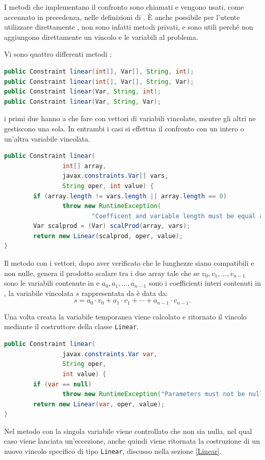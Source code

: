I metodi che implementano il confronto sono chiamati  e vengono
usati, come accennato in precedenza, nelle definizioni di . \`E
anche possibile per l'utente utilizzare direttamente , non sono 
infatti
metodi privati, e sono utili perché non aggiungono direttamente un vincolo
e le variabili al problema.

Vi sono quattro differenti metodi :
\begin{lstlisting}[language = Java, frame = single]
public Constraint linear(int[], Var[], String, int);
public Constraint linear(int[], Var[], String, Var);
public Constraint linear(Var, String, int);
public Constraint linear(Var, String, Var);
\end{lstlisting}
i primi due hanno a che fare con vettori di variabili vincolate, mentre gli 
altri ne gestiscono una sola. In entrambi i casi si effettua il confronto
con un intero o un'altra variabile vincolata.

\begin{lstlisting}[language = Java,
                   caption = {\files{linear}, con array di variabili.}]
public Constraint linear(
                int[] array, 
                javax.constraints.Var[] vars, 
                String oper, int value) {
        if (array.length != vars.length || array.length == 0)
                throw new RuntimeException(
                        "Coefficent and variable length must be equal and not zero.");
        Var scalprod = (Var) scalProd(array, vars);
        return new Linear(scalprod, oper, value);
}
\end{lstlisting}
Il metodo con i vettori, dopo aver verificato che le lunghezze siano 
compatibili e non nulle, genera il prodotto scalare tra i due array tale che
se $v_0, v_1, \ldots, v_{n-1}$ sono le variabili contenute in  e
$a_0, a_1, \ldots, a_{n-1}$ sono i coefficienti interi contenuti in 
,
la variabile vincolata $s$ rappresentata da  è data da:
\[
s = a_0\cdot v_0 + a_1\cdot v_1 + \cdots + a_{n-1}\cdot v_{n-1}.
\]

Una volta creata la variabile temporanea  viene calcolato 
e ritornato il vincolo mediante il costruttore della classe \texttt{Linear}.

\begin{lstlisting}[language = Java,
                   caption = {\files{linear}, con variabile singola.}]
public Constraint linear(
                javax.constraints.Var var, 
                String oper, 
                int value) {
        if (var == null)
                throw new RuntimeException("Parameters must not be null.");
        return new Linear(var, oper, value);
}
\end{lstlisting}
Nel metodo con la singola variabile viene controllato che  non sia
nulla, nel qual caso viene lanciata un'eccezione, anche quindi viene ritornata
la costruzione di un nuovo vincolo specifico di tipo \texttt{Linear}, discusso
nella sezione \ref{Linear}.

